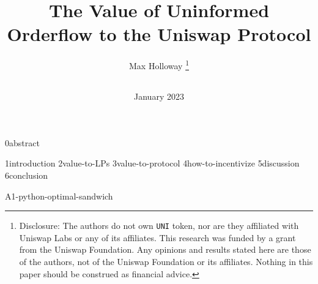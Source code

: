 \documentclass{article}
\title{The Value of Uninformed Orderflow to the Uniswap Protocol}
\author{
    Max Holloway \footnote{Disclosure: The authors do not own \texttt{UNI} token, nor are they affiliated with Uniswap Labs or any of its affiliates. This research was funded by a grant from the Uniswap Foundation. Any opinions and results stated here are those of the authors, not of the Uniswap Foundation or its affiliates. Nothing in this paper should be construed as financial advice.} \\
    \texttt{
        \href{mailto:max@xenophonlabs.com}{\color{black}{max@xenophonlabs.com}}
    } 
}
\date{January 2023}
\begin{document}
    \maketitle    
    {0abstract}
    
    {1introduction}
    {2value-to-LPs}
    {3value-to-protocol}
    {4how-to-incentivize}
    {5discussion}
    {6conclusion}
    
    \appendix
    \newpage
    {A1-python-optimal-sandwich}

    \newpage
    \printbibliography
    
\end{document}
